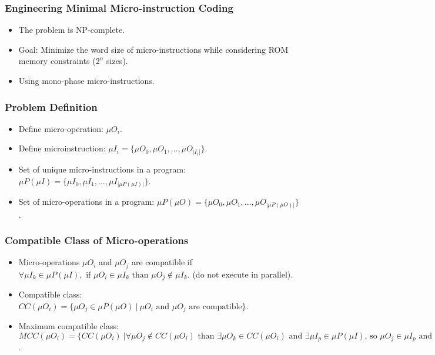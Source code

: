 \begin{frame} 
    \frametitle{Engineering Minimal Micro-instruction Coding}
    \begin{itemize} 
        \item The problem is NP-complete.
        \item Goal: Minimize the word size of micro-instructions while
        considering ROM memory constraints ($2^n$ sizes).
        \item Using mono-phase micro-instructions.
    \end{itemize}
\end{frame}

\begin{frame}
    \frametitle{Problem Definition}
    \begin{itemize}
        \item Define micro-operation: $\mu O_{i}$.
        \item Define microinstruction: $\mu I_{i} = \{ \mu O_{0}, \mu O_{1}, \ldots, \mu O_{|I_{i}|} \}$.
        \item Set of unique micro-instructions in a program: $\mu P(\mu I) = \{\mu I_{0}, \mu I_{1}, \ldots, \mu I_{|\mu P(\mu I)|}\}$.
        \item Set of micro-operations in a program: $\mu P(\mu O) = \{\mu O_{0}, \mu O_{1}, \ldots, \mu O_{|\mu P(\mu O)|}\}$.
    \end{itemize}
\end{frame}

\begin{frame}
    \frametitle{Compatible Class of Micro-operations}
    \begin{itemize}
        \item Micro-operations $\mu O_{i}$ and $\mu O_{j}$ are compatible if $\forall \mu I_{k} \in \mu P(\mu I),
        \text{ if } \mu O_{i} \in \mu I_{k} \text{ than } \mu O_{j} \notin \mu I_{k}$.
        (do not execute in parallel).
        \item Compatible class: $CC(\mu O_{i}) = \{\mu O_{j} \in \mu P(\mu O)
         \ | \ \mu O_{i} \text{ and } \mu O_{j} \text{ are compatible}\}$.
        \item Maximum compatible class: $MCC(\mu O_{i}) = \{ CC(\mu O_{i})
         \ | \forall  \mu O_{j} \notin CC(\mu O_{i}) \text{ than }
         \exists \mu O_{k} \in CC(\mu O_{i}) \text{ and }
         \exists \mu I_{p} \in \mu P(\mu I) \text{, so }
         \mu O_{j} \in \mu I_{p} \text{ and } \mu O_{k} \in  \mu I_{p} \}$.
    \end{itemize}
\end{frame}

